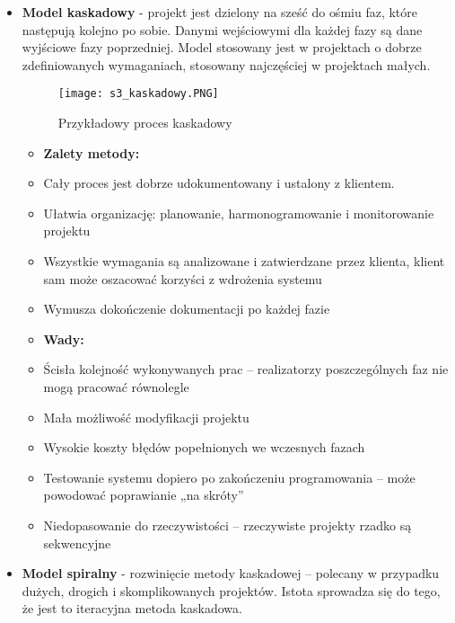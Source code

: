 \begin{itemize}
	\setlength\itemsep{1pt}
	\item \textbf{Model kaskadowy} - projekt jest dzielony na sześć do ośmiu faz, które następują kolejno po sobie. Danymi wejściowymi dla każdej fazy są dane wyjściowe fazy poprzedniej. Model stosowany jest w projektach o dobrze zdefiniowanych wymaganiach, stosowany najczęściej w projektach małych.
	
	\begin{figure}[H]
		\centering
		\texttt{[image: s3\_kaskadowy.PNG]}
		\caption{Przykładowy proces kaskadowy}
	\end{figure}
	
	\begin{itemize}
		\setlength\itemsep{1pt}
		\item[] \textbf{Zalety metody:}
		\item Cały proces jest dobrze udokumentowany i ustalony z klientem.
		\item Ułatwia organizację: planowanie, harmonogramowanie i monitorowanie projektu
		\item Wszystkie wymagania są analizowane i zatwierdzane przez klienta, klient sam może oszacować korzyści z wdrożenia systemu
		\item Wymusza dokończenie dokumentacji po każdej fazie
	\end{itemize}
	
	\begin{itemize}
		\setlength\itemsep{1pt}
		\item[] \textbf{Wady:}
		\item Ścisła kolejność wykonywanych prac – realizatorzy poszczególnych faz nie mogą pracować równolegle
		\item Mała możliwość modyfikacji projektu
		\item Wysokie koszty błędów popełnionych we wczesnych fazach
		\item Testowanie systemu dopiero po zakończeniu programowania – może powodować poprawianie „na skróty”
		\item Niedopasowanie do rzeczywistości – rzeczywiste projekty rzadko są sekwencyjne
	\end{itemize}
	
	\item \textbf{Model spiralny} - rozwinięcie metody kaskadowej – polecany w przypadku dużych, drogich i skomplikowanych projektów. Istota sprowadza się do tego, że jest to iteracyjna metoda kaskadowa.
	

\end{itemize}
